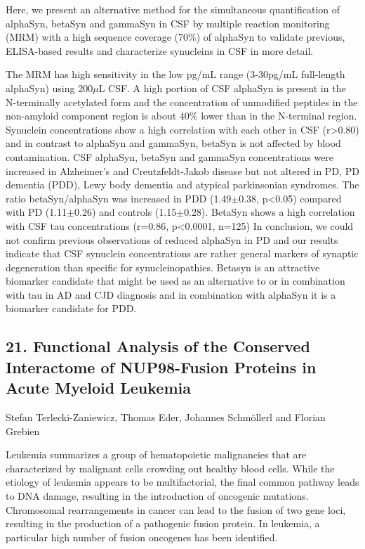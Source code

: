 Here, we present an alternative method for the simultaneous quantification of alphaSyn, betaSyn and gammaSyn in CSF by multiple reaction monitoring (MRM) with a high sequence coverage (70\%) of alphaSyn to validate previous, ELISA-based results and characterize synucleins in CSF in more detail.

The MRM has high sensitivity in the low pg/mL range (3-30pg/mL full-length alphaSyn) using 200$\mu$L CSF. A high portion of CSF alphaSyn is present in the N-terminally acetylated form and the concentration of unmodified peptides in the non-amyloid component region is about 40\% lower than in the N-terminal region. Synuclein concentrations show a high correlation with each other in CSF (r>0.80) and in contrast to alphaSyn and gammaSyn, betaSyn is not affected by blood contamination. CSF alphaSyn, betaSyn and gammaSyn concentrations were increased in Alzheimer's and Creutzfeldt-Jakob disease but not altered in PD, PD dementia (PDD), Lewy body dementia and atypical parkinsonian syndromes. The ratio betaSyn/alphaSyn was increased in PDD (1.49$\pm$0.38, p<0.05) compared with PD (1.11$\pm$0.26) and controls (1.15$\pm$0.28). BetaSyn shows a high correlation with CSF tau concentrations (r=0.86, p<0.0001, n=125)
In conclusion, we could not confirm previous observations of reduced alphaSyn in PD and our results indicate that CSF synuclein concentrations are rather general markers of synaptic degeneration than specific for synucleinopathies. Betasyn is an attractive biomarker candidate that might be used as an alternative to or in combination with tau in AD and CJD diagnosis and in combination with alphaSyn it is a biomarker candidate for PDD.

\subsection*{\color{eubicRed} 21. Functional Analysis of the Conserved Interactome of NUP98-Fusion Proteins in Acute Myeloid Leukemia}
{\color{eubicGray}Stefan Terlecki-Zaniewicz, Thomas Eder, Johannes Schmöllerl and Florian Grebien}

Leukemia summarizes a group of hematopoietic malignancies that are characterized by malignant cells crowding out healthy blood cells. While the etiology of leukemia appears to be multifactorial, the final common pathway leads to DNA damage, resulting in the introduction of oncogenic mutations. Chromosomal rearrangements in cancer can lead to the fusion of two gene loci, resulting in the production of a pathogenic fusion protein. In leukemia, a particular high number of fusion oncogenes has been identified.

